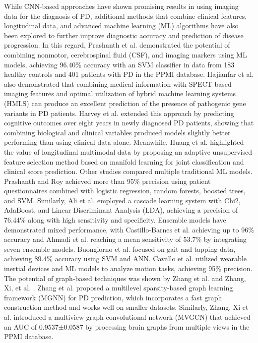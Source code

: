 \documentclass{article}
\begin{document}
While CNN-based approaches have shown promising results in using imaging data for the diagnosis of PD, additional methods that combine clinical features, longitudinal data, and advanced machine learning (ML) algorithms have also been explored to further improve diagnostic accuracy and prediction of disease progression. In this regard, Prashanth et al. \cite{DBLP:journals/ijmi/PrashanthRMG16} demonstrated the potential of combining nonmotor, cerebrospinal fluid (CSF), and imaging markers using ML models, achieving 96.40\% accuracy with an SVM classifier in data from 183 healthy controls and 401 patients with PD in the PPMI database. Hajianfar et al. \cite{hajianfar2023prediction} also demonstrated that combining medical information with SPECT-based imaging features and optimal utilization of hybrid machine learning systems (HMLS) can produce an excellent prediction of the presence of pathogenic gene variants in PD patients. Harvey et al. \cite{harvey2022machine} extended this approach by predicting cognitive outcomes over eight years in newly diagnosed PD patients, showing that combining biological and clinical variables produced models slightly better performing than using clinical data alone. Meanwhile, Huang et al. \cite{DBLP:journals/tnn/HuangLCFXEQL22} highlighted the value of longitudinal multimodal data by proposing an adaptive unsupervised feature selection method based on manifold learning for joint classification and clinical score prediction. Other studies compared multiple traditional ML models. Prashanth and Roy \cite{prashanth2018early} achieved more than 95\% precision using patient questionnaires combined with logistic regression, random forests, boosted trees, and SVM. Similarly, Ali et al. \cite{ali2019reliable} employed a cascade learning system with Chi2, AdaBoost, and Linear Discriminant Analysis (LDA), achieving a precision of 76.44\% along with high sensitivity and specificity. Ensemble models have demonstrated mixed performance, with Castillo-Barnes et al. \cite{castillo2018robust} achieving up to 96\% accuracy and Ahmadi et al. \cite{ahmadi2019towards} reaching a mean sensitivity of 53.7\% by integrating seven ensemble models. Buongiorno et al. \cite{buongiorno2019low} focused on gait and tapping data, achieving 89.4\% accuracy using SVM and ANN. Cavallo et al. \cite{cavallo2019upper} utilized wearable inertial devices and ML models to analyze motion tasks, achieving 95\% precision. The potential of graph-based techniques was shown by Zhang et al. \cite{zhang2023multi} and Zhang, Xi, et al. \cite{DBLP:conf/amia/Zhang00LZW18}. Zhang et al. \cite{zhang2023multi} proposed a multilevel sparsity-based graph learning framework (MGNN) for PD prediction, which incorporates a fast graph construction method and works well on smaller datasets. Similarly, Zhang, Xi et al. \cite{DBLP:conf/amia/Zhang00LZW18} introduced a multiview graph convolutional network (MVGCN) that achieved an AUC of 0.9537±0.0587 by processing brain graphs from multiple views in the PPMI database. 
\end{document}
